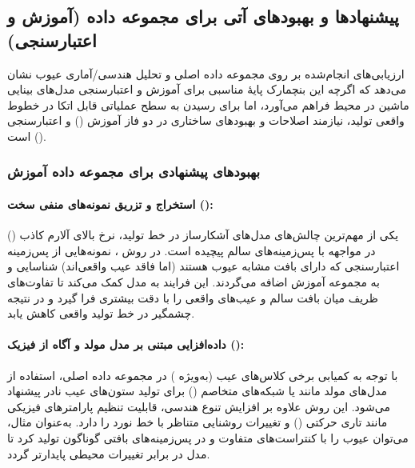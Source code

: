 \documentclass[a4paper, 10pt, twocolumn]{article}
\begin{document}
	\subsection{پیشنهادها و بهبودهای آتی برای مجموعه داده (آموزش و اعتبارسنجی)}
	
	ارزیابی‌های انجام‌شده بر روی مجموعه داده اصلی  و تحلیل هندسی/آماری عیوب نشان می‌دهد که اگرچه این بنچمارک پایهٔ مناسبی برای آموزش و اعتبارسنجی مدل‌های بینایی ماشین در محیط  فراهم می‌آورد، اما برای رسیدن به سطح عملیاتی قابل اتکا در خطوط واقعی تولید، نیازمند اصلاحات و بهبودهای ساختاری در دو فاز آموزش () و اعتبارسنجی () است.
	
	\subsubsection*{بهبودهای پیشنهادی برای مجموعه داده آموزش}
	
	\paragraph{استخراج و تزریق نمونه‌های منفی سخت (): }
	
	یکی از مهم‌ترین چالش‌های مدل‌های آشکارساز در خط تولید، نرخ بالای آلارم کاذب () در مواجهه با پس‌زمینه‌های سالم پیچیده است. در روش ، نمونه‌هایی از پس‌زمینه اعتبارسنجی که دارای بافت مشابه عیوب هستند (اما فاقد عیب واقعی‌اند) شناسایی و به مجموعه آموزش اضافه می‌گردند. این فرایند به مدل کمک می‌کند تا تفاوت‌های ظریف میان بافت سالم و عیب‌های واقعی را با دقت بیشتری فرا گیرد و در نتیجه چشمگیر  در خط تولید واقعی کاهش یابد.
	
	\paragraph{داده‌افزایی مبتنی بر مدل مولد و آگاه از فیزیک (): }
	
	با توجه به کمیابی برخی کلاس‌های عیب (به‌ویژه ) در مجموعه داده اصلی، استفاده از مدل‌های مولد مانند  یا شبکه‌های متخاصم () برای تولید ستون‌های عیب نادر پیشنهاد می‌شود. این روش علاوه بر افزایش تنوع هندسی، قابلیت تنظیم پارامترهای فیزیکی مانند تاری حرکتی () و تغییرات روشنایی متناظر با خط نورد را دارد. به‌عنوان مثال، می‌توان عیوب  را با کنتراست‌های متفاوت و در پس‌زمینه‌های بافتی گوناگون تولید کرد تا مدل در برابر تغییرات محیطی پایدارتر گردد.
	
\end{document}

